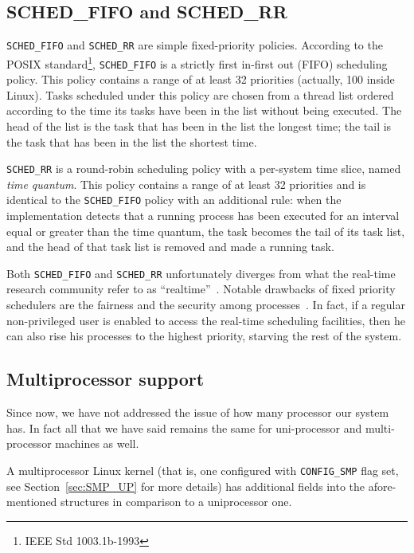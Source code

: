 \subsection{SCHED\_FIFO and SCHED\_RR}\label{sec:StateArt_FIFO}

\texttt{SCHED\_FIFO} and \texttt{SCHED\_RR} are simple fixed-priority
policies. According to the POSIX standard\footnote{IEEE Std
  1003.1b-1993}, \texttt{SCHED\_FIFO} is a strictly first in-first out
(FIFO) scheduling policy.  This policy contains a range of at least 32
priorities (actually, 100 inside Linux). Tasks scheduled under this
policy are chosen from a thread list ordered according to the time its
tasks have been in the list without being executed. The head of the
list is the task that has been in the list the longest time; the tail
is the task that has been in the list the shortest
time.

\texttt{SCHED\_RR} is a round-robin scheduling policy with a
per-system time slice, named \emph{time quantum}. This policy contains
a range of at least 32 priorities and is identical to the
\texttt{SCHED\_FIFO} policy with an additional rule: when the
implementation detects that a running process has been executed for an
interval equal or greater than the time quantum, the task becomes the
tail of its task list, and the head of that task list is removed and
made a running task.

Both \texttt{SCHED\_FIFO} and \texttt{SCHED\_RR} unfortunately
diverges from what the real-time research community refer to as
``realtime''~\cite{buttazzo06}. 
Notable drawbacks of fixed priority schedulers are the fairness
and the security among processes~\cite{abeni06}. In fact, if a regular
non-privileged user is enabled to access the real-time scheduling
facilities, then he can also rise his processes to the highest
priority, starving the rest of the system.

\subsection{Multiprocessor support\label{sec:LinuxSched_multiproc}}

Since now, we have not addressed the issue of how many processor our
system has. In fact all that we have said remains the same for
uni-processor and multi-processor machines as well.

A multiprocessor Linux kernel (that is, one configured with \texttt{CONFIG\_SMP} flag set,
see Section~\ref{sec:SMP_UP} for more details) has additional fields into the afore-mentioned 
structures in comparison to a uniprocessor one.


